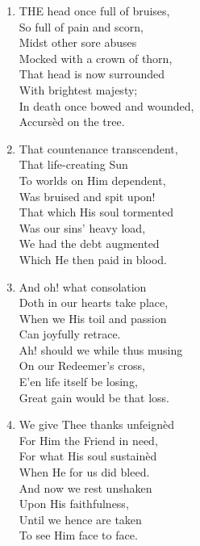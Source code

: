 \begin{enumerate}
    \item THE head once full of bruises, \\
        So full of pain and scorn, \\
        Midst other sore abuses \\
        Mocked with a crown of thorn, \\
        That head is now surrounded \\
        With brightest majesty; \\
        In death once bowed and wounded, \\
        Accurs\`ed on the tree.

    \item That countenance transcendent, \\
        That life-creating Sun \\
        To worlds on Him dependent, \\
        Was bruised and spit upon! \\
        That which His soul tormented \\
        Was our sins' heavy load, \\
        We had the debt augmented \\
        Which He then paid in blood.

    \item And oh! what consolation \\
        Doth in our hearts take place, \\
        When we His toil and passion \\
        Can joyfully retrace. \\
        Ah! should we while thus musing \\
        On our Redeemer's cross, \\
        E'en life itself be losing, \\
        Great gain would be that loss.

    \item We give Thee thanks unfeign\`ed \\
        For Him the Friend in need, \\
        For what His soul sustain\`ed \\
        When He for us did bleed. \\
        And now we rest unshaken \\
        Upon His faithfulness, \\
        Until we hence are taken \\
        To see Him face to face.

\end{enumerate}

